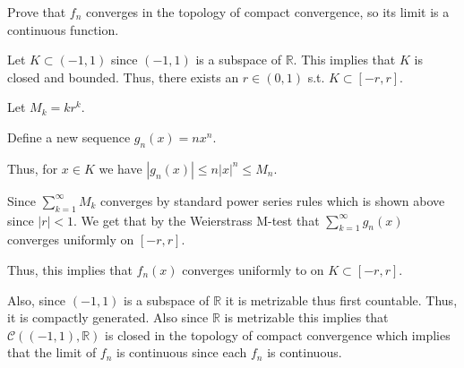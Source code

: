 \documentclass[12pt, letterpaper]{article}
\newcommand{\R}{\mathbb{R}}
\begin{document}
\begin{subproblem}{}
    Prove that $f_n$ converges in the
    topology of compact convergence, so its limit is a continuous
    function.
\end{subproblem}
\begin{problemproof}
    Let $K \subset (-1,1)$ since $(-1,1)$ is a subspace of $\R$. This implies that $K$ is closed and bounded. Thus, there exists an $r \in (0,1)$ s.t. $K \subset [-r,r]$.

    Let $M_k=kr^k$.

    Define a new sequence $g_n(x)=nx^n$.

    Thus, for $x \in K$ we have $|g_n(x)| \leq n|x|^n \leq M_n$.

    Since $\sum_{k=1}^\infty M_k$ converges by standard power series rules which is shown above since $|r|<1$. We get that by the Weierstrass M-test that $\sum_{k=1}^\infty g_n(x)$ converges uniformly on $[-r,r]$.

    Thus, this implies that $f_n(x)$ converges uniformly to on $K \subset [-r,r]$.

    Also, since $(-1,1)$ is a subspace of $\R$ it is metrizable thus first countable. Thus, it is compactly generated. Also since $\R$ is metrizable this implies that $\mathcal{C}((-1,1),\R)$ is closed in the topology of compact convergence which implies that the limit of $f_n$ is continuous since each $f_n$ is continuous.
\end{problemproof}
\end{document}
